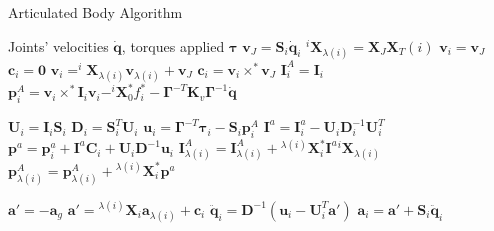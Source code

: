 \begin{algorithm}[H]
    \caption{Articulated Body Algorithm}
    \label{alg:aba}
    \begin{algorithmic}[1]
        \REQUIRE Joints' velocities $\dot{\mathbf{q}}$, torques applied $\boldsymbol{\tau}$
        \STATE $\mathrm{\mathbf{v}}_J = \mathbf{S}_i \dot{\mathbf{q}}_i$
        \STATE $^i\mathbf{X}_{\lambda(i)} = \mathbf{X}_J\mathbf{X}_T (i)$
        \STATE $\mathrm{\mathbf{v}}_i = \mathrm{\mathbf{v}}_J$
        \STATE $\mathbf{c}_i = \mathbf{0}$
        \ELSE
        \STATE $\mathrm{\mathbf{v}}_i = ^i\mathbf{X} _{\lambda(i)}\mathrm{\mathbf{v}}_{\lambda(i)} + \mathrm{\mathbf{v}}_J$
        \STATE $\mathbf{c}_i = \mathrm{\mathbf{v}}_i \times ^* \mathrm{\mathbf{v}}_J$
        \ENDIF
        \STATE $\mathbf{I}_i ^A = \mathbf{I}_i$
        \STATE $\mathbf{p}_i ^A = \mathrm{\mathbf{v}}_i \times^* \mathbf{I}_i\mathrm{\mathbf{v}}_i - ^i\mathbf{X} _0 ^* f ^* _i - \boldsymbol{\Gamma} ^{-T}\mathbf{K}_v \boldsymbol{\Gamma} ^{-1} \mathbf{\dot{q}}$
        \ENDFOR

        \STATE $\mathbf{U}_i = \mathbf{I}_i \mathbf{S}_i$
        \STATE $\mathbf{D}_i = \mathbf{S}_i ^T \mathbf{U}_i$
        \STATE $\mathbf{u}_i = \boldsymbol{\Gamma}^{-T}\boldsymbol{\tau}_i - \mathbf{S}_i\mathbf{p}_i^A$
        \STATE $\mathbf{I}^a = \mathbf{I}^a_i - \mathbf{U}_i\mathbf{D}_i ^{-1}\mathbf{U}_i ^T$
        \STATE $\mathbf{p}^a = \mathbf{p}^a_i + \mathbf{I}^a\mathbf{C}_i + \mathbf{U}_i\mathbf{D}^{-1}\mathbf{u}_i$
        \STATE $\mathbf{I}^A_{\lambda(i)} = \mathbf{I}^A_{\lambda(i)} + {}^{\lambda(i)}\mathbf{X}_i^* \mathbf{I}^a {}^i\mathbf{X}_{\lambda(i)}$
        \STATE $\mathbf{p}^A_{\lambda(i)} = \mathbf{p}^A_{\lambda(i)} + {}^{\lambda(i)}\mathbf{X}_i^*\mathbf{p}^a$
        \ENDIF
        \ENDFOR

        \STATE $\mathbf{a}' = -\mathbf{a}_g$
        \ELSE
        \STATE $\mathbf{a}' = {}^{\lambda(i)}\mathbf{X}_i \mathbf{a}_{\lambda(i)} + \mathbf{c}_i$
        \STATE $\ddot{\mathbf{q}}_i = \mathbf{D}^{-1} (\mathbf{u}_i - \mathbf{U}_i^T\mathbf{a}')$
        \STATE $\mathbf{a}_i = \mathbf{a}' + \mathbf{S}_i\mathbf{\ddot{q}}_i$
        \ENDIF
        \ENDFOR
    \end{algorithmic}
\end{algorithm}
